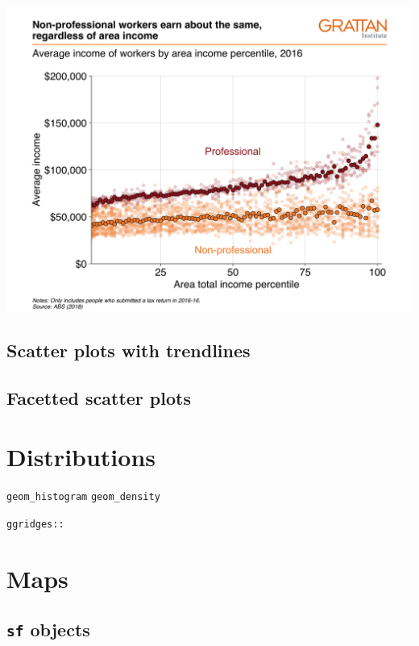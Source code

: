 \documentclass[
]{book}
\begin{document}
\includegraphics[width=44.44in]{atlas/scatter_layer}

\hypertarget{scatter-plots-with-trendlines}{%
\subsection{Scatter plots with trendlines}\label{scatter-plots-with-trendlines}}

\hypertarget{facetted-scatter-plots}{%
\subsection{Facetted scatter plots}\label{facetted-scatter-plots}}

\hypertarget{distributions}{%
\section{Distributions}\label{distributions}}

\texttt{geom\_histogram}
\texttt{geom\_density}

\texttt{ggridges::}

\hypertarget{maps}{%
\section{Maps}\label{maps}}

\hypertarget{sf-objects}{%
\subsection{\texorpdfstring{\texttt{sf} objects}{sf objects}}\label{sf-objects}}
\end{document}
